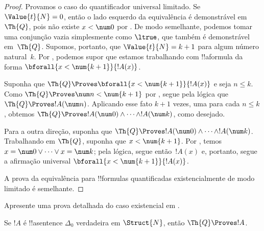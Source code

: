 \documentclass[../../../include/open-logic-section]{subfiles}
\begin{document}
\begin{proof}
    Provamos o caso do quantificador universal limitado. Se
    $\Value{t}{N} = 0$, então o lado esquerdo da equivalência é
    demonstrável em~$\Th{Q}$, pois não existe $x<\num 0$ por
    . De modo semelhante, podemos
    tomar uma conjunção vazia simplesmente como $\ltrue$, que também é
    demonstrável em~$\Th{Q}$.
    Supomos, portanto, que $\Value{t}{N} = k+1$ para algum número
    natural~$k$. Por , podemos supor que
    estamos trabalhando com !!a{formula} da forma
    $\bforall{x<\num{k+1}}{!A(x)}$.
    
    Suponha que $\Th{Q} \Proves \bforall{x<\num{k+1}}{!A(x)}$ e seja
    $n \leq k$. Como $\Th{Q} \Proves \num n < \num{k+1}$ por
    , segue pela lógica que
    $\Th{Q} \Proves !A(\num n)$. Aplicando esse fato $k+1$ vezes, uma
    para cada $n \leq k$, obtemos
    $\Th{Q} \Proves !A(\num 0) \land \dots \land !A(\num k)$, como
    desejado.
    
    Para a outra direção, suponha que
    $\Th{Q} \Proves !A(\num 0) \land \dots \land !A(\num k)$.
    Trabalhando em $\Th{Q}$, suponha que $x < \num{k+1}$. Por
    , temos
    $x = \num 0 \lor \dots \lor x = \num k$; pela lógica, segue
    então~$!A(x)$ e, portanto, segue a afirmação universal
    $\bforall{x<\num{k+1}}{!A(x)}$.
    
    A prova da equivalência para !!{formula}s quantificadas
    existencialmente de modo limitado é semelhante.
\end{proof}

\begin{prob}
Apresente uma prova detalhada do caso existencial em
.
\end{prob}

\begin{lem}
Se $!A$ é !!a{sentence} $\Delta_0$ verdadeira em $\Struct{N}$, então
$\Th{Q} \Proves !A$.
\end{lem}
\end{document}
